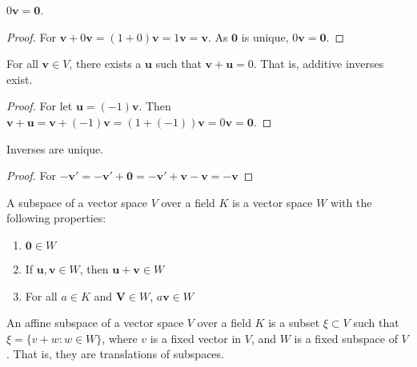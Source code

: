 \documentclass[crop=false,class=article,oneside]{standalone}
\begin{document}
        \begin{theorem}
        $0\mathbf{v} = \mathbf{0}$.
        \end{theorem}
        \begin{proof}
        For $\mathbf{v}+0\mathbf{v} = (1+0)\mathbf{v} = 1\mathbf{v} = \mathbf{v}$. As $\mathbf{0}$ is unique, $0\mathbf{v}=\mathbf{0}$.
        \end{proof}
        \begin{theorem}
        For all $\mathbf{v}\in V$, there exists a $\mathbf{u}$ such that $\mathbf{v}+\mathbf{u}=0$. That is, additive inverses exist.
        \end{theorem}
        \begin{proof}
        For let $\mathbf{u} = (-1)\mathbf{v}$. Then $\mathbf{v}+\mathbf{u} = \mathbf{v}+(-1)\mathbf{v} = (1+(-1))\mathbf{v} = 0\mathbf{v} = \mathbf{0}$.
        \end{proof}
        \begin{theorem}
        Inverses are unique.
        \end{theorem}
        \begin{proof}
        For $-\mathbf{v}'=-\mathbf{v}'+\mathbf{0}=-\mathbf{v}'+\mathbf{v}-\mathbf{v}=- \mathbf{v}$
        \end{proof}
        \begin{definition}
        A subspace of a vector space $V$ over a field $K$ is a vector space $W$ with the following properties:
        \begin{enumerate}
            \item $\mathbf{0} \in W$
            \item If $\mathbf{u,v}\in W$, then $\mathbf{u}+\mathbf{v} \in W$
            \item For all $a\in K$ and $\mathbf{V} \in W$, $a\mathbf{v} \in W$
        \end{enumerate}
        \end{definition}
        \begin{definition}
        An affine subspace of a vector space $V$ over a field $K$ is a subset $\xi\subset V$ such that $\xi = \{v+w:w\in W\}$, where $v$ is a fixed vector in $V$, and $W$ is a fixed subspace of $V$. That is, they are translations of subspaces.
        \end{definition}
\end{document}
